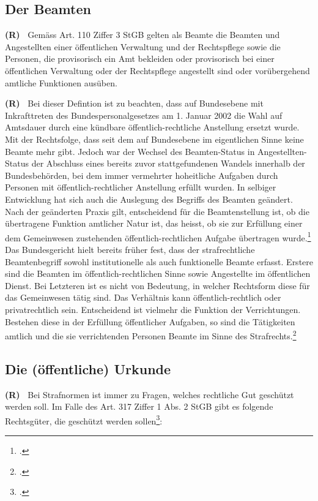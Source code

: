 \documentclass[paper=a4,fontsize=12pt, oneside, numbers=noenddot]{scrbook}
\newcounter{rz}
\newcommand{\Rz}{
	\addtocounter{rz}{1}\textbf{(R\arabic{rz})~}
}
\begin{document}
\subsection{Der Beamten}\label{Recht:Beamte}
\Rz Gemäss Art. 110 Ziffer 3 StGB gelten als Beamte die Beamten und Angestellten einer öffentlichen Verwaltung und der Rechtspflege sowie die Personen, die provisorisch ein Amt bekleiden oder provisorisch bei einer öffentlichen Verwaltung oder der Rechtspflege angestellt sind oder vorübergehend amtliche Funktionen ausüben. 

\Rz Bei dieser Defintion ist zu beachten, dass auf Bundesebene mit Inkrafttreten des Bundespersonalgesetzes am 1. Januar 2002 die Wahl auf Amtsdauer durch eine kündbare öffentlich-rechtliche Anstellung ersetzt wurde. Mit der Rechtsfolge, dass seit dem auf Bundesebene im eigentlichen Sinne keine Beamte mehr gibt. Jedoch war der Wechsel des Beamten-Status in Angestellten-Status der Abschluss eines bereits zuvor stattgefundenen Wandels innerhalb der Bundesbehörden, bei dem immer vermehrter hoheitliche Aufgaben durch Personen mit öffentlich-rechtlicher Anstellung erfüllt wurden. In selbiger Entwicklung hat sich auch die Auslegung des Begriffs des Beamten geändert. Nach der geänderten Praxis gilt, entscheidend für die Beamtenstellung ist, ob die übertragene Funktion amtlicher Natur ist, das heisst, ob sie zur Erfüllung einer dem Gemeinwesen zustehenden öffentlich-rechtlichen Aufgabe übertragen wurde.\footcite[Erw. 1.3]{BGE141IV329} Das Bundesgericht hielt bereits früher fest, dass der strafrechtliche Beamtenbegriff sowohl institutionelle als auch funktionelle Beamte erfasst. Erstere sind die Beamten im öffentlich-rechtlichen Sinne sowie Angestellte im öffentlichen Dienst. Bei Letzteren ist es nicht von Bedeutung, in welcher Rechtsform diese für das Gemeinwesen tätig sind. Das Verhältnis kann öffentlich-rechtlich oder privatrechtlich sein. Entscheidend ist vielmehr die Funktion der Verrichtungen. Bestehen diese in der Erfüllung öffentlicher Aufgaben, so sind die Tätigkeiten amtlich und die sie verrichtenden Personen Beamte im Sinne des Strafrechts.\footcite{BGE135IV198}



\subsection{Die (öffentliche) Urkunde}
\Rz Bei Strafnormen ist immer zu Fragen, welches rechtliche Gut geschützt werden soll. Im Falle des Art. 317 Ziffer 1 Abs. 2 StGB gibt es folgende Rechtsgüter, die geschützt werden sollen\footcite[Art. 317, Rz. 1]{2020:Wohlers:StGBHandkommentar}:
\end{document}
